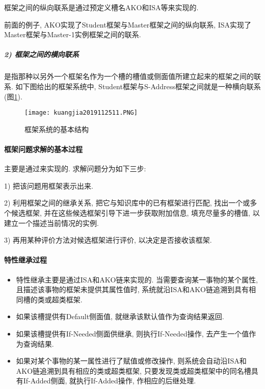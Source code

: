 框架之间的纵向联系是通过预定义槽名AKO和ISA等来实现的.
\begin{example}
    前面的例子, AKO实现了Student框架与Master框架之间的纵向联系, ISA实现了Master框架与Master-1实例框架之间的联系.
\end{example}
\subparagraph{2) 框架之间的横向联系}
    是指那种以另外一个框架名作为一个槽的槽值或侧面值所建立起来的框架之间的联系. 如下图给出的框架系统中, Student框架与S-Address框架之间就是一种横向联系(图\ref{AI32fig11}).
\begin{figure}[H]
    \centering
    \texttt{[image: kuangjia2019112511.PNG]}
    \caption{框架系统的基本结构}
    \label{AI32fig11}
\end{figure}
\paragraph{框架问题求解的基本过程}
    主要是通过来实现的. 求解问题分为如下三步:

1) 把该问题用框架表示出来.

2) 利用框架之间的继承关系, 把它与知识库中的已有框架进行匹配, 找出一个或多个候选框架, 并在这些候选框架引导下进一步获取附加信息, 填充尽量多的槽值, 以建立一个描述当前情况的实例.

3) 再用某种评价方法对候选框架进行评价, 以决定是否接收该框架.
\paragraph{特性继承过程}
\begin{itemize}
    \item  特性继承主要是通过ISA和AKO链来实现的. 当需要查询某一事物的某个属性, 且描述该事物的框架未提供其属性值时, 系统就沿ISA和AKO链追溯到具有相同槽的类或超类框架.
    \item  如果该槽提供有Default侧面值, 就继承该默认值作为查询结果返回.
    \item  如果该槽提供有If-Needed侧面供继承, 则执行If-Needed操作, 去产生一个值作为查询结果.
    \item  如果对某个事物的某一属性进行了赋值或修改操作, 则系统会自动沿ISA和AKO链追溯到具有相应的类或超类框架, 只要发现类或超类框架中的同名槽具有If-Added侧面, 就执行If-Added操作, 作相应的后继处理.
\end{itemize}
